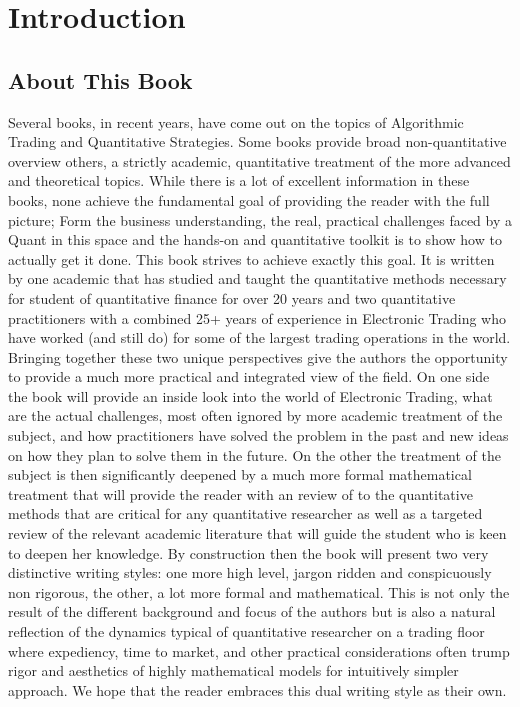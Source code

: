 \chapter{Introduction}
\section{About This Book}

Several books, in recent years, have come out  on the topics of Algorithmic Trading and Quantitative Strategies. Some books provide broad non-quantitative overview others, a strictly academic, quantitative treatment of the more advanced and theoretical topics. While there is a lot of excellent information in these books, none achieve the fundamental goal of providing the reader with the full picture; Form the business understanding, the real, practical challenges faced by a Quant in this space and the hands-on and quantitative toolkit is to show how to actually get it done. This book strives to achieve exactly this goal. It is written by one academic that has studied and taught the quantitative methods necessary for student of quantitative finance for over 20 years and two quantitative practitioners with a combined 25+ years of experience in Electronic Trading who have worked (and still do) for some of the largest trading operations in the world. Bringing together these two unique perspectives give the authors the opportunity to provide a much more practical and integrated view of the field. On one side the book will provide an inside look into the world of Electronic Trading, what are the actual challenges, most often ignored by more academic treatment of the subject, and how practitioners have solved the problem in the past and new ideas on how they plan to solve them in the future. On the other the treatment of the subject is then significantly deepened by a much more formal mathematical treatment that will provide the reader with an review of to the quantitative methods that are critical for any quantitative researcher as well as a targeted review of the relevant academic literature that will guide the student who is keen to deepen her knowledge. By construction then the book will present two very distinctive writing styles: one more high level, jargon ridden and conspicuously non rigorous, the other, a lot more formal and mathematical. This is not only the result of the different  background and focus of the authors but is also a natural reflection of the dynamics typical  of quantitative researcher on a trading floor where expediency, time to market, and other practical considerations often trump rigor and aesthetics of highly mathematical models for intuitively simpler approach. We hope that the reader embraces this dual writing style as their own.


